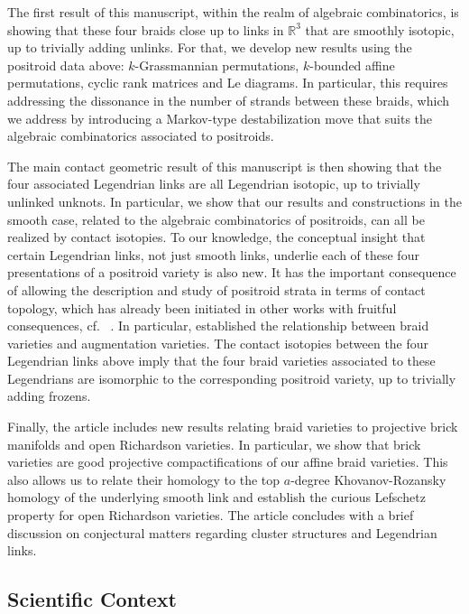 \documentclass[10pt]{amsart}
\theoremstyle{plain}
\theoremstyle{definition}
\theoremstyle{remark}
\numberwithin{equation}{section}
\newcommand{\R}{\mathbb{R}}
\newcommand{\MG}[1]{{\color{teal}{{\bf Misha}: #1}}}
\begin{document}
The first result of this manuscript, within the realm of algebraic combinatorics, is showing that these four braids close up to links in $\R^3$ that are smoothly isotopic, up to trivially adding unlinks. For that, we develop new results  using the positroid data above: $k$-Grassmannian permutations, $k$-bounded affine permutations,  cyclic rank matrices and Le diagrams. In particular, this requires addressing the dissonance in the number of strands between these braids, which we address by introducing a Markov-type destabilization move that suits the algebraic combinatorics associated to positroids.

\noindent The main contact geometric result of this manuscript is then showing that the four associated Legendrian links are all Legendrian isotopic, up to trivially unlinked %
unknots. In particular, we show that our results and  constructions in the smooth case, related to the algebraic combinatorics of positroids, can all be realized by contact isotopies. To our knowledge, the conceptual insight that certain Legendrian links, not just smooth links, underlie each of these four presentations of a positroid variety is also new. It has the important consequence of allowing the description and study of positroid strata in terms of contact topology, which has already been initiated in other works with fruitful consequences, cf.~ \cite{asplund2023lagrangian,cgglss,CGGS,CGLSBW,CasalsWeng22}. In particular, \cite[Theorem 1.1]{CGGS} established the relationship between braid varieties and augmentation varieties. The contact isotopies between the four Legendrian links above imply that the four braid varieties associated to these Legendrians are isomorphic to the corresponding positroid variety, up to trivially adding frozens.

\noindent Finally, the article includes new results relating braid varieties to projective brick manifolds and open Richardson varieties. In particular, we show that brick varieties are good projective compactifications of our affine braid varieties. This also allows us to relate their homology to the top $a$-degree Khovanov-Rozansky homology of the underlying smooth link and establish the curious Lefschetz property for open Richardson varieties. The article concludes with a brief discussion on conjectural matters regarding cluster structures and Legendrian links.
\subsection{Scientific Context}\label{ssec:scientific_context}
\end{document}
